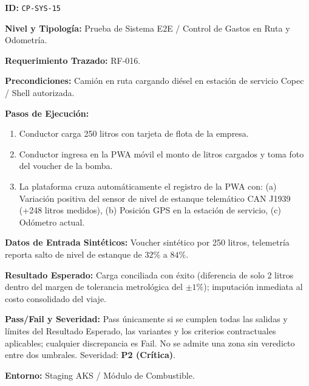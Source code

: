\par\noindent\textbf{ID:} \texttt{C\allowbreak{}P\allowbreak{}-\allowbreak{}S\allowbreak{}Y\allowbreak{}S\allowbreak{}-\allowbreak{}1\allowbreak{}5\allowbreak{}}\par
\par\noindent\textbf{Nivel y Tipología:} Prueba de Sistema E2E / Control de Gastos en Ruta y Odometría.\par
\par\noindent\textbf{Requerimiento Trazado:} RF-016.\par
\par\noindent\textbf{Precondiciones:} Camión en ruta cargando diésel en estación de servicio Copec / Shell autorizada.\par
\par\noindent\textbf{Pasos de Ejecución:} \par
\begin{enumerate}
\item Conductor carga 250 litros con tarjeta de flota de la empresa.
\item Conductor ingresa en la PWA móvil el monto de litros cargados y toma foto del voucher de la bomba.
\item La plataforma cruza automáticamente el registro de la PWA con: (a) Variación positiva del sensor de nivel de estanque telemático CAN J1939 (+248 litros medidos), (b) Posición GPS en la estación de servicio, (c) Odómetro actual.
\end{enumerate}
\par\noindent\textbf{Datos de Entrada Sintéticos:} Voucher sintético por 250 litros, telemetría reporta salto de nivel de estanque de \(32\%\) a \(84\%\).\par
\par\noindent\textbf{Resultado Esperado:} Carga conciliada con éxito (diferencia de solo 2 litros dentro del margen de tolerancia metrológica del \(\pm 1\%\)); imputación inmediata al costo consolidado del viaje.\par
\par\noindent\textbf{Pass/Fail y Severidad:} Pass únicamente si se cumplen todas las salidas y límites del Resultado Esperado, las variantes y los criterios contractuales aplicables; cualquier discrepancia es Fail. No se admite una zona sin veredicto entre dos umbrales. Severidad: \textbf{P2 (Crítica)}.\par
\par\noindent\textbf{Entorno:} Staging AKS / Módulo de Combustible.\par







